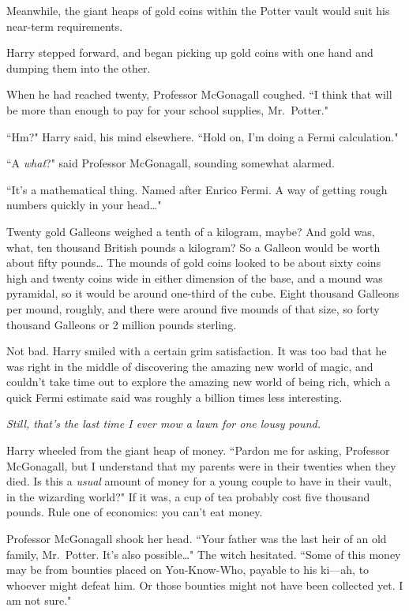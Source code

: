 Meanwhile, the giant heaps of gold coins within the Potter vault would suit his near-term requirements.

Harry stepped forward, and began picking up gold coins with one hand and dumping them into the other.

When he had reached twenty, Professor McGonagall coughed. ``I think that will be more than enough to pay for your school supplies, Mr.~Potter."

``Hm?" Harry said, his mind elsewhere. ``Hold on, I'm doing a Fermi calculation."

``A \emph{what}?" said Professor McGonagall, sounding somewhat alarmed.

``It's a mathematical thing. Named after Enrico Fermi. A way of getting rough numbers quickly in your head{\ldots}"

Twenty gold Galleons weighed a tenth of a kilogram, maybe? And gold was, what, ten thousand British pounds a kilogram? So a Galleon would be worth about fifty pounds{\ldots} The mounds of gold coins looked to be about sixty coins high and twenty coins wide in either dimension of the base, and a mound was pyramidal, so it would be around one-third of the cube. Eight thousand Galleons per mound, roughly, and there were around five mounds of that size, so forty thousand Galleons or 2 million pounds sterling.

Not bad. Harry smiled with a certain grim satisfaction. It was too bad that he was right in the middle of discovering the amazing new world of magic, and couldn't take time out to explore the amazing new world of being rich, which a quick Fermi estimate said was roughly a billion times less interesting.

\emph{Still, that's the last time I ever mow a lawn for one lousy pound.}

Harry wheeled from the giant heap of money. ``Pardon me for asking, Professor McGonagall, but I understand that my parents were in their twenties when they died. Is this a \emph{usual} amount of money for a young couple to have in their vault, in the wizarding world?" If it was, a cup of tea probably cost five thousand pounds. Rule one of economics: you can't eat money.

Professor McGonagall shook her head. ``Your father was the last heir of an old family, Mr.~Potter. It's also possible{\ldots}" The witch hesitated. ``Some of this money may be from bounties placed on You-Know-Who, payable to his ki---ah, to whoever might defeat him. Or those bounties might not have been collected yet. I am not sure."

